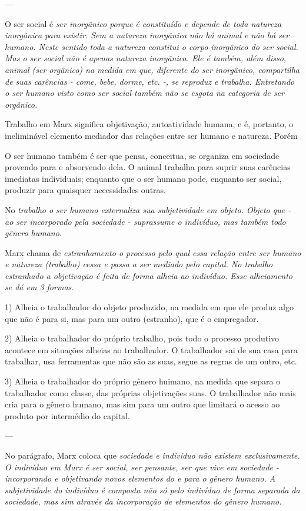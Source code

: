 \documentclass[12pt]{article}
\begin{document}
---


O ser social é \em ser inorgânico \em porque é constituído e depende de toda natureza inorgânica para existir.
Sem a natureza inorgânica não há animal e não há ser humano.
Neste sentido toda a natureza constitui o corpo inorgânico do ser social.
Mas o ser social não é apenas natureza inorgânica.
Ele é também, além disso, \em animal \em (ser orgânico) na medida em que, diferente do ser inorgânico, compartilha de suas carências - come, bebe, dorme, etc. -, se reproduz e \em trabalha\em.
Entretando o ser humano visto como ser social também não se esgota na categoria de ser orgânico.

Trabalho em Marx significa objetivação, autoatividade humana, e é, portanto, o ineliminável elemento mediador das relações entre ser humano e natureza.
Porém

O ser humano também é ser que pensa, conceitua, se organiza em sociedade provendo para e absorvendo dela.
O animal trabalha para suprir suas carências imediatas individuais; enquanto que o ser humano pode, enquanto ser social, produzir para quaisquer necessidades outras.

No \em trabalho \em o ser humano externaliza sua subjetividade em objeto.
Objeto que - ao ser incorporado pela sociedade - suprassume o indivíduo, mas também todo gênero humano.

Marx chama de \em estranhamento \em o processo pelo qual essa relação entre ser humano e natureza (trabalho) cessa e passa a ser mediado pelo capital.
No \em trabalho estranhado \em a objetivação é feita de forma alheia ao indivíduo.
Esse alheiamento se dá em 3 formas.

1) Alheia o trabalhador do objeto produzido, na medida em que ele produz algo que não é para si, mas para um outro (estranho), que é o empregador.

2) Alheia o trabalhador do próprio trabalho, pois todo o processo produtivo acontece em situações alheias ao trabalhador.
O trabalhador sai de sua casa para trabalhar, usa ferramentas que não são as suas, segue as regras de um outro, etc.

3) Alheia o trabalhador do próprio gênero huimano, na medida que separa o trabalhador como classe, das próprias objetivações suas. O trabalhador não mais cria para o gênero humano, mas sim para um outro que limitará o acesso ao produto por intermédio do capital.


--- 


No parágrafo, Marx coloca que \em sociedade \em e \em indivíduo \em não existem exclusivamente.
O indivíduo em Marx é ser social, ser pensante, ser que vive em sociedade - incorporando e  objetivando novos elementos do e para o gênero humano.
A subjetividade do indivíduo é composta não só pelo indivíduo de forma separada da sociedade, mas sim através da incorporação de elementos do gênero humano.
\end{document}
